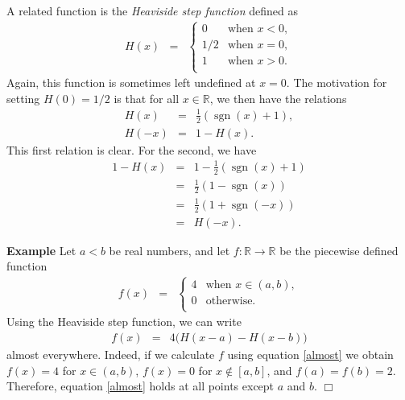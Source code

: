\documentclass[12pt]{article}
\newcommand{\signum}[0]{\mathop{\mathrm{sgn}}}
\newcommand{\R}[0]{\mathbb{R}}
\begin{document}
A related function is the \emph{Heaviside step function}
 defined as
 \begin{eqnarray*}
 H(x) &=& \left\{ \begin {array}{ll} 0 & \mbox{when}\,\, x< 0, \\
  1/2 & \mbox{when}\,\, x= 0,\\
  1 & \mbox{when}\,\, x> 0.\\
 \end{array} \right.
 \end{eqnarray*}
 Again, this function is sometimes left undefined at $x=0$.
 The motivation for setting $H(0)=1/2$ is that
 for all $x\in\R$, we then have the relations
 \begin{eqnarray*}
 H (x) &=& \frac{1}{2}(\signum(x)+1), \\
 H(-x) &=& 1-H(x).
 \end{eqnarray*}
 This first relation is clear. For the second, we have
 \begin{eqnarray*}
 1-H(x) &=& 1-\frac{1}{2}(\signum(x)+1) \\
  &=& \frac{1}{2}(1-\signum(x)) \\
  &=& \frac{1}{2}(1+\signum(- x)) \\
  &=& H(-x).
 \end{eqnarray*}
 
{\bf Example} Let $a<b$ be real numbers, and let $f:\R\to\R$ be the
 piecewise defined function
 \begin{eqnarray*}
 f (x) &=& \left\{ \begin {array}{ll} 
 4 & \mbox{when}\,\, x\in(a,b), \\
  0 & \mbox{otherwise.} \\
 \end{array} \right.
 \end{eqnarray*}
 Using the Heaviside step function, we can write
 \begin{eqnarray}
 \label{almost}
  f(x) &=& 4\big(H(x-a) - H(x-b)\big)
 \end{eqnarray}
 almost everywhere.
 Indeed, if we calculate $f$ using equation \ref{almost} we obtain
 $f(x)=4$ for $x\in(a,b)$, $f(x)=0$ for $x\notin[a,b]$,
 and $f(a)=f(b)=2$. Therefore, equation \ref{almost}
 holds at all points except $a$ and $b$.
 $\Box$
\end{document}
